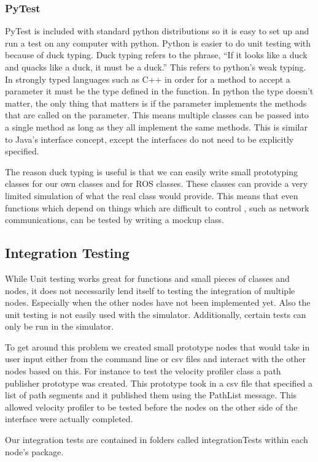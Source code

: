 \subsubsection{PyTest}

PyTest is included with standard python distributions so it is easy to set up and run a test on any computer with python.  Python is easier to do unit testing with because of duck typing.  Duck typing refers to the phrase, ``If it looks like a duck and quacks like a duck, it must be a duck.'' \cite{python_duck_typing} This refers to python's weak typing. In strongly typed languages such as C++ in order for a method to accept a parameter it must be the type defined in the function. In python the type doesn't matter, the only thing that matters is if the parameter implements the methods that are called on the parameter. This means multiple classes can be passed into a single method as long as they all implement the same methods. This is similar to Java's interface concept, except the interfaces do not need to be explicitly specified.

The reason duck typing is useful is that we can easily write small prototyping classes for our own classes and for ROS classes. These classes can provide a very limited simulation of what the real class would provide. This means that even functions which depend on things which are difficult to control , such as network communications, can be tested by writing a mockup class.

\subsection{Integration Testing}

While Unit testing works great for functions and small pieces of classes and nodes, it does not necessarily lend itself to testing the integration of multiple nodes. Especially when the other nodes have not been implemented yet. Also the unit testing is not easily used with the simulator. Additionally, certain tests can only be run in the simulator.

To get around this problem we created small prototype nodes that would take in user input either from the command line or csv files and interact with the other nodes based on this. For instance to test the velocity profiler class a path publisher prototype was created. This prototype took in a csv file that specified a list of path segments and it published them using the PathList message. This allowed velocity profiler to be tested before the nodes on the other side of the interface were actually completed.

Our integration tests are contained in folders called integrationTests within each node's package.